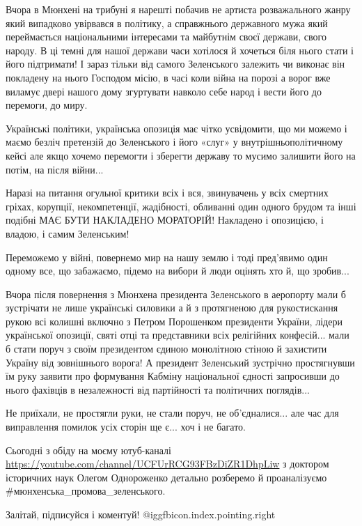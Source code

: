 Вчора в Мюнхені на трибуні я нарешті побачив не артиста розважального жанру
який випадково увірвався в політику, а справжнього державного мужа який
переймається національними інтересами та майбутнім своєї держави, свого народу.
В ці темні для нашої держави часи хотілося й хочеться біля нього стати і його
підтримати! І зараз тільки від самого Зеленського залежить чи виконає він
покладену на нього Господом місію, в часі коли війна на порозі а ворог вже
виламує двері нашого дому згуртувати навколо себе народ і вести його до
перемоги, до миру. 

Українські політики, українська опозиція має чітко усвідомити, що ми можемо і
маємо безліч претензій до Зеленського і його «слуг» у внутрішньополітичному
кейсі але якщо хочемо перемогти і зберегти державу то мусимо залишити його на
потім, на після війни... 

Наразі на питання огульної критики всіх і вся, звинувачень у всіх смертних
гріхах, корупції, некомпетенції, жадібності, обливанні один одного брудом та
інші подібні МАЄ БУТИ НАКЛАДЕНО МОРАТОРІЙ! Накладено і опозицією, і владою, і
самим Зеленським! 

Переможемо у війні, повернемо мир на нашу землю і тоді пред’явимо один одному
все, що забажаємо, підемо на вибори й люди оцінять хто й, що зробив... 

Вчора після повернення з Мюнхена президента Зеленського в аеропорту мали б
зустрічати не лише українські силовики а й з протягненою для рукостискання
рукою всі колишні включно з Петром Порошенком президенти України, лідери
української опозиції, святі отці та представники всіх релігійних конфесій... мали
б стати поруч з своїм президентом єдиною монолітною стіною й захистити Україну
від зовнішнього ворога! А президент Зеленський зустрічно простягнувши їм руку
заявити про формування Кабміну національної єдності запросивши до нього
фахівців в незалежності від партійності та політичних поглядів... 

Не приїхали, не простягли руки, не стали поруч, не об'єдналися... але час для
виправлення помилок усіх сторін ще є... хоч і не багато. 

Сьогодні з обіду на моєму ютуб-каналі
\url{https://youtube.com/channel/UCFUrRCG93FBzDiZR1DhpLiw}
з доктором історичних
наук Олегом Однороженко детально розберемо й проаналізуємо
\#мюнхенська\_промова\_зеленського. 

Залітай, підписуйся і коментуй! @igg{fbicon.index.pointing.right} 
